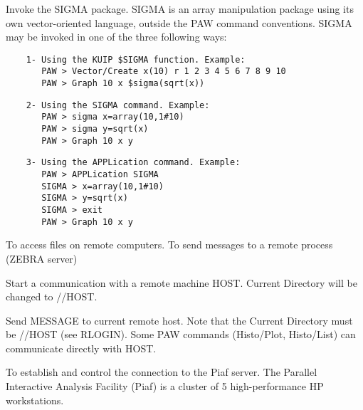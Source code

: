 \ENDCMD


\BEGARG
{}
\ENDARG

   \par
Invoke the SIGMA package.  SIGMA is an array manipulation package using its 
   own vector-oriented language, outside the PAW command conventions.  SIGMA 
   may be invoked in one of the three following ways:  
\begin{verbatim}
    1- Using the KUIP $SIGMA function. Example:
       PAW > Vector/Create x(10) r 1 2 3 4 5 6 7 8 9 10
       PAW > Graph 10 x $sigma(sqrt(x))
\end{verbatim}
\begin{verbatim}
    2- Using the SIGMA command. Example:
       PAW > sigma x=array(10,1#10)
       PAW > sigma y=sqrt(x)
       PAW > Graph 10 x y
\end{verbatim}
\begin{verbatim}
    3- Using the APPLication command. Example:
       PAW > APPLication SIGMA
       SIGMA > x=array(10,1#10)
       SIGMA > y=sqrt(x)
       SIGMA > exit
       PAW > Graph 10 x y
\end{verbatim}

\ENDCMD
{}
\ifMENUtext
   \par
To access files on remote computers.  To send messages to a remote process 
   (ZEBRA server) 


\fi


\BEGARG
{}
\ENDARG

   \par
Start a communication with a remote machine HOST.  Current Directory will 
   be changed to //HOST.  

\ENDCMD


\BEGARG
{}
\ENDARG

   \par
Send MESSAGE to current remote host.  Note that the Current Directory must 
   be //HOST (see RLOGIN).  Some PAW commands (Histo/Plot, Histo/List) can 
   communicate directly with HOST.  

\ENDCMD
{}
\ifMENUtext
   \par
To establish and control the connection to the Piaf server.  The Parallel 
   Interactive Analysis Facility (Piaf) is a cluster of 5 high-performance HP 
   workstations.  

